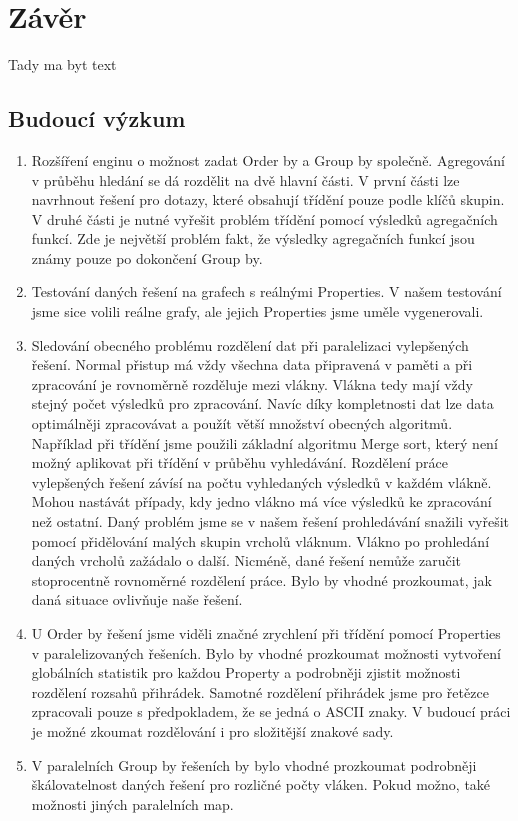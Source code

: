 \chapter{Závěr}

Tady ma byt text

\section{Budoucí výzkum}


\begin{enumerate}


\item Rozšíření enginu o možnost zadat Order by a Group by společně.
Agregování v průběhu hledání se dá rozdělit na dvě hlavní části.
V první části lze navrhnout řešení pro dotazy, které obsahují třídění pouze podle klíčů skupin.
V druhé části je nutné vyřešit problém třídění pomocí výsledků agregačních funkcí.
Zde je největší problém fakt, že výsledky agregačních funkcí jsou známy pouze po dokončení Group by.

\item Testování daných řešení na grafech s reálnými Properties.
V našem testování jsme sice volili reálne grafy, ale jejich Properties jsme uměle vygenerovali.

\item Sledování obecného problému rozdělení dat při paralelizaci vylepšených řešení. 
Normal přistup má vždy všechna data připravená v paměti a při zpracování je rovnoměrně rozděluje mezi vlákny.
Vlákna tedy mají vždy stejný počet výsledků pro zpracování.
Navíc díky kompletnosti dat lze data optimálněji zpracovávat a použít větší množství obecných algoritmů.
Například při třídění jsme použili základní algoritmu Merge sort, který není možný aplikovat při třídění v průběhu vyhledávání.  
Rozdělení práce vylepšených řešení závísí na počtu vyhledaných výsledků v každém vlákně.
Mohou nastávát případy, kdy jedno vlákno má více výsledků ke zpracování než ostatní. 
Daný problém jsme se v našem řešení prohledávání snažili vyřešit pomocí přidělování malých skupin vrcholů vláknum.
Vlákno po prohledání daných vrcholů zažádalo o další.
Nicméně, dané řešení nemůže zaručit stoprocentně rovnoměrné rozdělení práce.
Bylo by vhodné prozkoumat, jak daná situace ovlivňuje naše řešení.

\item U Order by řešení jsme viděli značné zrychlení při třídění pomocí Properties v paralelizovaných řešeních.
Bylo by vhodné prozkoumat možnosti vytvoření globálních statistik pro každou Property a podrobněji zjistit možnosti rozdělení rozsahů přihrádek.
Samotné rozdělení přihrádek jsme pro řetězce zpracovali pouze s předpokladem, že se jedná o ASCII znaky.
V budoucí práci je možné zkoumat rozdělování i pro složitější znakové sady.

\item V paralelních Group by řešeních by bylo vhodné prozkoumat podrobněji škálovatelnost daných řešení pro rozličné počty vláken.
Pokud možno, také možnosti jiných paralelních map.
 
\end{enumerate}